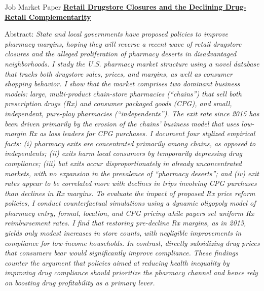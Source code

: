 \documentclass{resume} %
\begin{document}
	\begin{rSection}{Job Market Paper}
		\href{chanwoolkim.github.io}{\textbf{Retail Drugstore Closures and the Declining Drug-Retail Complementarity}}
		
		Abstract: \textit{State and local governments have proposed policies to improve pharmacy margins, hoping they will reverse a recent wave of retail drugstore closures and the alleged proliferation of pharmacy deserts in disadvantaged neighborhoods. I study the U.S. pharmacy market structure using a novel database that tracks both drugstore sales, prices, and margins, as well as consumer shopping behavior. I show that the market comprises two dominant business models: large, multi-product chain-store pharmacies (``chains'') that sell both prescription drugs (Rx) and consumer packaged goods (CPG), and small, independent, pure-play pharmacies (``independents''). The exit rate since 2015 has been driven primarily by the erosion of the chains’ business model that uses low-margin Rx as loss leaders for CPG purchases. I document four stylized empirical facts: (i) pharmacy exits are concentrated primarily among chains, as opposed to independents; (ii) exits harm local consumers by temporarily depressing drug compliance; (iii) but exits occur disproportionately in already unconcentrated markets, with no expansion in the prevalence of ``pharmacy deserts''; and (iv) exit rates appear to be correlated more with declines in trips involving CPG purchases than declines in Rx margins. To evaluate the impact of proposed Rx price reform policies, I conduct counterfactual simulations using a dynamic oligopoly model of pharmacy entry, format, location, and CPG pricing while payers set uniform Rx reimbursement rates. I find that restoring pre-decline Rx margins, as in 2015, yields only modest increases in store counts, with negligible improvements in compliance for low-income households. In contrast, directly subsidizing drug prices that consumers bear would significantly improve compliance. These findings counter the argument that policies aimed at reducing health inequality by improving drug compliance should prioritize the pharmacy channel and hence rely on boosting drug profitability as a primary lever.}
	\end{rSection}

		
\end{document}
